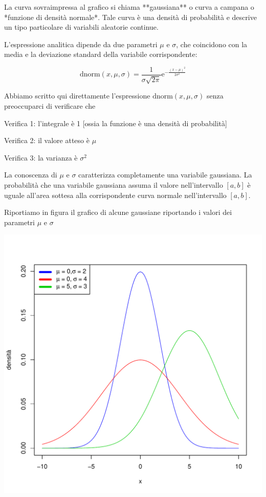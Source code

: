 \documentclass[onecolumn,12pt]{book}\usepackage[]{graphicx}\usepackage[]{color}
\makeatletter
\def\maxwidth{ %
  \ifdim\Gin@nat@width>\linewidth
    \linewidth
  \else
    \Gin@nat@width
  \fi
}
\newenvironment{knitrout}{}{} %
\makeatother
\begin{document}
La curva sovraimpressa al grafico si chiama **gaussiana** o curva a campana o *funzione di densità normale*. Tale curva è una densità di probabilità e descrive un tipo particolare di variabili aleatorie continue.

L'espressione analitica  dipende da due parametri $\mu$ e $\sigma$,  che coincidono con la media e la deviazione standard della variabile corrispondente:


$$\textrm{dnorm}(x,\mu,\sigma)=\frac{1}{\sigma\sqrt{2 \pi} } \textrm{e}^{-\frac{(x - \mu)^2}{2 \sigma^2}}$$

Abbiamo scritto qui direttamente l'espressione $\textrm{dnorm}(x,\mu,\sigma)$ senza preoccuparci di verificare che

Verifica 1:  l'integrale è 1 [ossia la funzione è una densità di probabilità]

Verifica 2: il valore atteso è $\mu$
 
Verifica 3: la varianza è $\sigma^2$

La conoscenza di $\mu$ e $\sigma$ caratterizza completamente una variabile gaussiana.  La probabilità che una variabile gaussiana assuma il valore nell'intervallo $[a,b]$ è uguale all'area sottesa alla corrispondente curva normale nell'intervallo $[a,b]$.


Riportiamo in figura  il grafico di alcune gaussiane riportando i valori dei parametri  $\mu$ e $\sigma$

\begin{knitrout}
\color{fgcolor}
\includegraphics[width=\maxwidth]{figure/unnamed-chunk-135-1} 

\end{knitrout}
\end{document}

